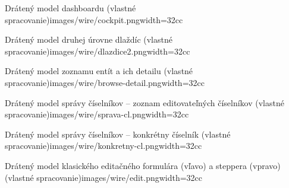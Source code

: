 {Drátený model dashboardu (vlastné spracovanie)}{images/wire/cockpit.png}{width=32cc}

{Drátený model druhej úrovne dlaždíc (vlastné spracovanie)}{images/wire/dlazdice2.png}{width=32cc}

{Drátený model zoznamu entít a ich detailu (vlastné spracovanie)}{images/wire/browse-detail.png}{width=32cc}

{Drátený model správy číselníkov -- zoznam editovateľných číselníkov (vlastné spracovanie)}{images/wire/sprava-cl.png}{width=32cc}

{Drátený model správy číselníkov -- konkrétny číselník (vlastné spracovanie)}{images/wire/konkretny-cl.png}{width=32cc}

{Drátený model klasického editačného formulára (vľavo) a steppera (vpravo) (vlastné spracovanie)}{images/wire/edit.png}{width=32cc}


\setupTABLE[frame=on]
\setupTABLE[row][first][background=color, backgroundcolor=lightgray, style=bold]
\setupTABLE[column][1][width=3cc]
\setupTABLE[column][2][width=15cc]
\setupTABLE[column][3][width=14cc]
\setupTABLE[r][each][align={middle,lohi}]


